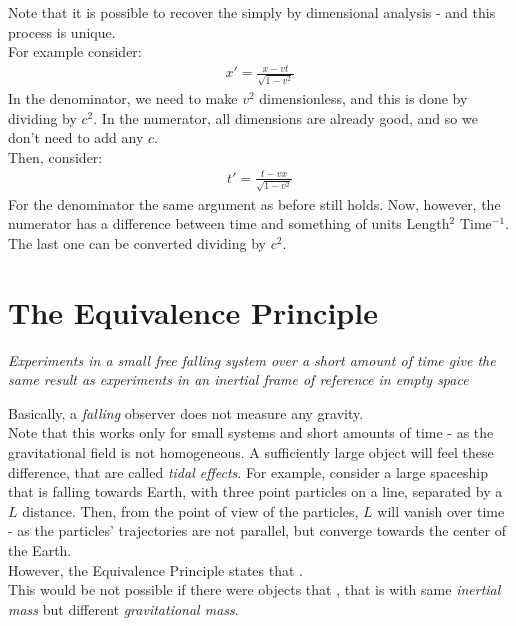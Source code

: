 \documentclass[../template.tex]{subfiles}
\begin{document}
Note that it is possible to recover the  simply by dimensional analysis - and this process is unique.\\
For example consider:
\begin{align*}
    x' = \frac{x-vt}{\sqrt{1-v^2}} 
\end{align*} 
In the denominator, we need to make $v^2$ dimensionless, and this is done by dividing by $c^2$. In the numerator, all dimensions are already good, and so we don't need to add any $c$.\\
Then, consider:
\begin{align*}
    t' = \frac{t-vx}{\sqrt{1-v^2}} 
\end{align*}
For the denominator the same argument as before still holds. Now, however, the numerator has a difference between time and something of units Length$^2$ Time$^{-1}$. The last one can be converted dividing by $c^2$.

\section{The Equivalence Principle}
\begin{center}
    \textit{Experiments in a small free falling system over a short amount of time give the same result as experiments in an inertial frame of reference in empty space} 
\end{center}
Basically, a \textit{falling} observer does not measure any gravity.\\
Note that this works only for small systems and short amounts of time - as the gravitational field is not homogeneous. A sufficiently large object will feel these difference, that are called \textit{tidal effects}. For example, consider a large spaceship that is falling towards Earth, with three point particles on a line, separated by a $L$ distance. Then, from the point of view of the particles, $L$ will vanish over time - as the particles' trajectories are not parallel, but converge towards the center of the Earth.\\  

However, the Equivalence Principle states that .\\

This would be not possible if there were objects that , that is with same \textit{inertial mass} but different \textit{gravitational mass}.\\
\end{document}
